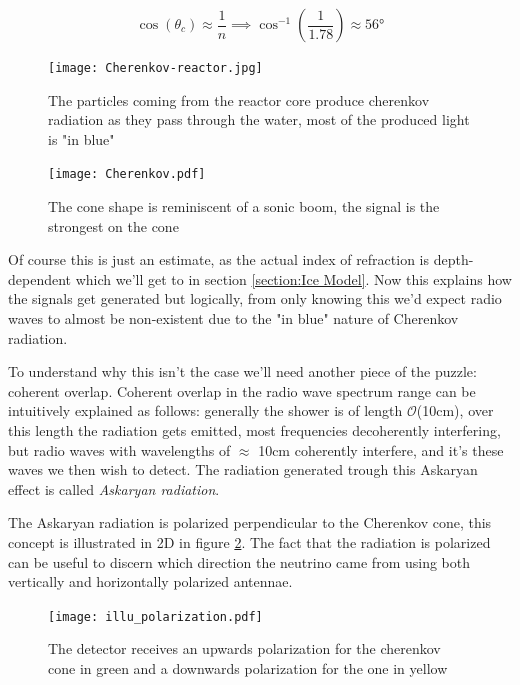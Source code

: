 \begin{equation}
	\cos(\theta_c) \approx \frac{1}{n} \implies \cos^{-1}\left(\frac{1}{1.78}\right)\approx 56\text{°}
\end{equation}
\begin{figure}
\centering
\begin{minipage}{0.45\textwidth}
	\centering
	\texttt{[image: Cherenkov-reactor.jpg]}
	\caption{The particles coming from the reactor core produce cherenkov radiation as they pass through the water,
	most of the produced light is "in blue"}
	\label{figure: Cherenkov reactor}
\end{minipage}
\hspace{0.05\textwidth}
\begin{minipage}{0.45\textwidth}
	\centering
	\texttt{[image: Cherenkov.pdf]}
	\caption{The cone shape is reminiscent of a sonic boom, the signal is the strongest on the cone }
	\label{figure: Cherenkov illustratie}
\end{minipage}
\end{figure}
Of course this is just an estimate, as the actual index of refraction is depth-dependent which
we'll get to in section \ref{section:Ice Model}.
Now this explains how the signals get generated but logically, from only knowing this
we'd expect radio waves to almost be non-existent 
due to the "in blue" nature of Cherenkov radiation. 

To understand why this isn't the case we'll need another piece of the puzzle: coherent overlap.
Coherent overlap in the radio wave spectrum range can be intuitively explained as
follows: generally the shower is of length
$\mathcal{O}$(10cm)\cite{Huege_2017}, over this length the radiation gets
emitted, most frequencies decoherently interfering, but radio waves with wavelengths of 
$\approx$ 10cm coherently interfere, and it's these waves we then wish to detect.
The radiation generated trough this Askaryan effect is called \textit{Askaryan radiation}.

The Askaryan radiation is polarized perpendicular to the Cherenkov cone, this
concept is illustrated in 2D in figure \ref{fig:illupol}.
The fact that the radiation is polarized can be useful to discern which
direction the neutrino came from using both vertically and horizontally
polarized antennae.
\begin{figure}
	\centering
	\texttt{[image: illu\_polarization.pdf]}
	\caption{The detector receives an upwards polarization for the cherenkov cone in green
	and a downwards polarization for the one in yellow}
  	\label{fig:illupol}
\end{figure}

